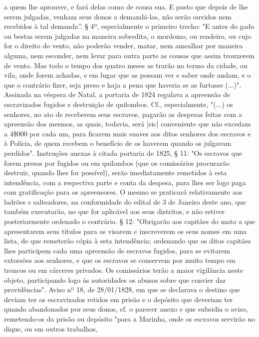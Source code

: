 {  a quem lhe aprouver, e fará delas como de cousa sua. E posto que
  depois de lhe serem julgadas, venham seus donos a demandá-las, não
  serão ouvidos nem recebidos à tal demanda''. § 4º, especialmente o
  primeiro trecho: "E antes do gado ou bestas serem julgadas na maneira
  sobredita, o mordomo, ou rendeiro, ou cujo for o direito do vento, não
  poderão vender, matar, nem amealhar por maneira alguma, nem esconder,
  nem levar para outra parte as cousas que assim trouxerem de vento. Mas
  todo o tempo dos quatro meses as trarão no termo da cidade, ou vila,
  onde forem achadas, e em lugar que as possam ver e saber onde andam, e
  o que o contrário fizer, seja preso e haja a pena que haveria se as
  furtasse (...)". Assinada na véspera de Natal, a portaria de 1824
  regulava a apreensão de escravizados fugidos e destruição de
  quilombos. Cf., especialmente, "(...) os senhores, no ato de receberem
  seus escravos, pagarão as despesas feitas com a apreensão dos mesmos,
  as quais, todavia, será {[}sic{]} conveniente que não excedam a 4\$000
  por cada um, para ficarem mais suaves aos ditos senhores dos escravos
  e à Polícia, de quem recebem o benefício de os haverem quando os
  julgavam perdidos". Instruções anexas à citada portaria de 1825, § 11:
  "Os escravos que forem presos por fugidos ou em quilombos (que os
  comissários procurarão destruir, quando lhes for possível), serão
  imediatamente remetidos à esta intendência, com a respectiva parte e
  conta da despesa, para lhes ser logo paga com gratificação para os
  apreensores. O mesmo se praticará relativamente aos ladrões e
  salteadores, na conformidade do edital de 3 de Janeiro deste ano, que
  também executarão, no que for aplicável aos seus distritos, e não
  estiver posteriormente ordenado o contrário. § 12: "Obrigarão aos
  capitães do mato a que apresentarem seus títulos para os visarem e
  inscreverem os seus nomes em uma lista, de que remeterão cópia à esta
  intendência; ordenando que os ditos capitães lhes participem cada uma
  apreensão de escravos fugidos, para se evitarem extorsões aos
  senhores, e que os escravos se conservem por muito tempo em troncos ou
  em cárceres privados. Os comissários terão a maior vigilância neste
  objeto, participando logo às autoridades os abusos sobre que convier
  dar providências". Aviso nº 18, de 28/01/1828, em que se declarava o
  destino que deviam ter os escravizados retidos em prisão e o depósito
  que deveriam ter quando abandonados por seus donos, cf. o parecer
  anexo e que subsidia o aviso, remetendo-os da prisão ou depósito "para
  a Marinha, onde os escravos servirão no dique, ou em outros trabalhos,
}
